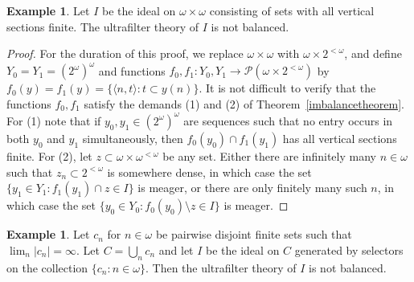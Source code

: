 \documentclass{article}
\newcommand{\gw}{\omega}
\newcommand{\cantor}{2^\gw}
\newcommand{\bintree}{2^{<\gw}}
\newcommand{\gwtree}{\gw^{<\gw}}
\newcommand{\power}{\mathcal{P}}
\theoremstyle{definition}
\newtheorem{example}[theorem]{Example}
\begin{document}
\begin{example}
	Let $I$ be the ideal on $\gw\times\gw$ consisting of sets with all vertical sections finite. The ultrafilter theory of $I$ is not balanced.
\end{example}



\begin{proof}
	For the duration of this proof, we replace $\gw\times\gw$ with $\gw\times\bintree$, and define $Y_0=Y_1=(\cantor)^\gw$ and functions $f_0, f_1\colon Y_0, Y_1\to\power(\gw\times\bintree)$ by $f_0(y)=f_1(y)=\{\langle n, t\rangle\colon t\subset y(n)\}$. It is not difficult to verify that the functions $f_0, f_1$ satisfy the demands (1) and (2) of Theorem~\ref{imbalancetheorem}. For (1) note that if $y_0, y_1\in (\cantor)^\gw$ are sequences such that no entry occurs in both $y_0$ and $y_1$ simultaneously, then $f_0(y_0)\cap f_1(y_1)$ has all vertical sections finite. For (2), let $z\subset\gw\times\gwtree$ be any set. Either there are infinitely many $n\in\gw$ such that $z_n\subset\bintree$ is somewhere dense, in which case the set $\{y_1\in Y_1\colon f_1(y_1)\cap z\in I\}$ is meager, or there are only finitely many such $n$, in which case the set $\{y_0\in Y_0\colon f_0(y_0)\setminus z\in I\}$ is meager.
\end{proof}




\begin{example}
Let $c_n$ for $n\in\gw$ be pairwise disjoint finite sets such that $\lim_n |c_n|=\infty$. Let $C=\bigcup_nc_n$ and let $I$ be the ideal on $C$ generated by selectors on the collection $\{c_n\colon n\in\gw\}$. Then the ultrafilter theory of $I$ is not balanced.
\end{example}
\end{document}
